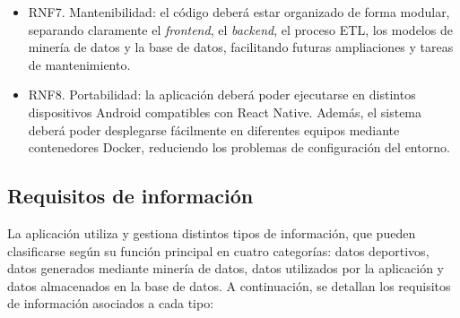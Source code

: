 \begin{itemize}
    \item RNF7. Mantenibilidad: el código deberá estar organizado de forma modular, separando claramente el \textit{frontend}, el \textit{backend}, el proceso ETL, los modelos de minería de datos y la base de datos, facilitando futuras ampliaciones y tareas de mantenimiento.

    \item RNF8. Portabilidad: la aplicación deberá poder ejecutarse en distintos dispositivos Android compatibles con React Native. Además, el sistema deberá poder desplegarse fácilmente en diferentes equipos mediante contenedores Docker, reduciendo los problemas de configuración del entorno.

\end{itemize}


\subsection{Requisitos de información}

La aplicación utiliza y gestiona distintos tipos de información, que pueden clasificarse según su función principal en cuatro categorías: datos deportivos, datos generados mediante minería de datos, datos utilizados por la aplicación y datos almacenados en la base de datos. A continuación, se detallan los requisitos de información asociados a cada tipo:

